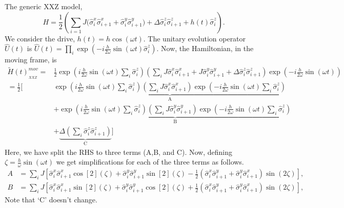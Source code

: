 \documentclass[aps,prb,reprint,showpacs,floatfix,superscriptaddress, onecolumn, nofootinbib, 9pt]{revtex4-2}
\begin{document}
\begin{enumerate}
{			The generic XXZ model,
			\begin{equation*}
				H = \frac12 \left( \sum_{i=1} J \big(\hat{\sigma}^x_i \hat{\sigma}^x_{i+1} + \hat{\sigma}^y_i \hat{\sigma}^y_{i+1}\big) + \Delta  \hat{\sigma}^z_i \hat{\sigma}^z_{i+1} + h(t)  \hat{\sigma}^z_i\right).
				\label{eq:heisenberg_model}
			\end{equation*}
			We consider the drive, $h(t) = h \cos(\omega t)$. The unitary evolution operator $\displaystyle \hat{U}(t)$ is $\hat{U}(t)=\prod_{i} \exp \left(-i \frac{h}{2 \omega} \sin (\omega t) \hat{\sigma}_{i}^{z}\right)$. Now, the Hamiltonian, in the moving frame, is
			\begin{align}
				\tilde{H}(t)_{_{XXZ}}^{mov}= & \frac{1}{2} \exp \left(i \frac{h}{2 \omega} \sin (\omega t) \sum_{i} \hat{\sigma}_{i}^{z}\right)\left(\sum_{i} J \hat{\sigma}^x_i \hat{\sigma}^x_{i+1} + J \hat{\sigma}^y_i \hat{\sigma}^y_{i+1}+ \Delta  \hat{\sigma}^z_i \hat{\sigma}^z_{i+1}\right) \exp \left(-i \frac{h}{2 \omega} \sin (\omega t)\right)\nonumber\\
				= \frac12 \Bigg[& \underbrace{\exp \left(i \frac{h}{2 \omega} \sin (\omega t) \sum_{i} \hat{\sigma}_{i}^{z}\right)\left(\sum_{i} J \hat{\sigma}_{i}^{x} \hat{\sigma}_{i+1}^{x}\right) \exp \left(-i \frac{h}{2 \omega} \sin (\omega t) \sum_i\hat{\sigma}_{i}^{z}\right)}_{\mathrm{A}} \nonumber\\
				& +\underbrace{\exp \left(i \frac{h}{2 \omega} \sin (\omega t) \sum_{i} \hat{\sigma}_{i}^{z}\right)\left(\sum_{i} J \hat{\sigma}_{i}^{y} \hat{\sigma}_{i+1}^{y}\right) \exp \left(-i \frac{h}{2 \omega} \sin (\omega t) \sum_i\hat{\sigma}_{i}^{z}\right)}_{\mathrm{B}} \nonumber\\
				& +\underbrace{\Delta \left(\sum_{i}  \hat{\sigma}_{i}^{z} \hat{\sigma}_{i+1}^{z}\right)}_{\mathrm{C}}\Bigg]
				\label{eq:xxz1}
			\end{align}
			Here, we have split the RHS to three terms (A,B, and C). Now, defining $\zeta = \frac{h}{\omega}\sin(\omega t)$ we get simplifications for each of the three terms as follows.
			\begin{align}
				A &= \sum_{i} J \left[ \hat{\sigma}^x_i \hat{\sigma}^x_{i+1} \cos[2](\zeta) + \hat{\sigma}^y_i \hat{\sigma}^y_{i+1} \sin[2](\zeta)- \frac12\left(\hat{\sigma}^x_i \hat{\sigma}^y_{i+1} + \hat{\sigma}^y_i \hat{\sigma}^x_{i+1}\right)\sin(2\zeta)\right],
				\nonumber\\
				B &= \sum_{i} J \left[ \hat{\sigma}^x_i \hat{\sigma}^x_{i+1} \sin[2](\zeta) + \hat{\sigma}^y_i \hat{\sigma}^y_{i+1} \cos[2](\zeta)+ \frac12\left(\hat{\sigma}^x_i \hat{\sigma}^y_{i+1} + \hat{\sigma}^y_i \hat{\sigma}^x_{i+1}\right)\sin(2\zeta)\right],
				\label{eq:abmov}
			\end{align}
			Note that `C' doesn't change.
			
}
\end{enumerate}
\end{document}
